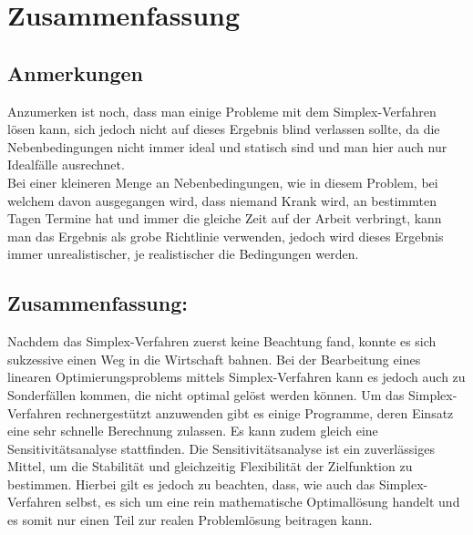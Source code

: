 \section{Zusammenfassung }
\subsection{Anmerkungen}
Anzumerken ist noch, dass man einige Probleme mit dem Simplex-Verfahren lösen kann, sich jedoch nicht auf dieses Ergebnis blind verlassen sollte, da die Nebenbedingungen nicht immer ideal und statisch sind und man hier auch nur Idealfälle ausrechnet.  \\
Bei einer kleineren Menge an Nebenbedingungen, wie in diesem Problem, bei welchem davon ausgegangen wird, dass niemand Krank wird, an bestimmten Tagen Termine hat und immer die gleiche Zeit auf der Arbeit verbringt, kann man das Ergebnis als grobe Richtlinie verwenden, jedoch wird dieses Ergebnis immer unrealistischer, je realistischer die Bedingungen werden.
\subsection{Zusammenfassung: }
Nachdem das Simplex-Verfahren zuerst keine Beachtung fand, konnte es  sich sukzessive einen Weg in die Wirtschaft bahnen. 
Bei der Bearbeitung eines linearen Optimierungsproblems mittels Simplex-Verfahren kann es jedoch auch zu Sonderfällen kommen, die nicht optimal gelöst werden können.
Um das Simplex-Verfahren rechnergestützt anzuwenden gibt es einige Programme, deren Einsatz eine sehr schnelle Berechnung zulassen. Es kann zudem gleich eine Sensitivitätsanalyse stattfinden. 
Die Sensitivitätsanalyse ist ein zuverlässiges Mittel, um die Stabilität und gleichzeitig Flexibilität der Zielfunktion zu bestimmen. Hierbei gilt es jedoch zu beachten, dass, wie auch das Simplex-Verfahren selbst, es sich um eine rein mathematische Optimallösung handelt und es somit nur einen Teil zur realen Problemlösung beitragen kann.
